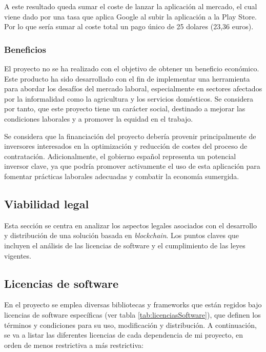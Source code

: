 A este resultado queda sumar el coste de lanzar la aplicación al mercado, el cual viene dado por una tasa que aplica Google al subir la aplicación a la Play Store. Por lo que sería sumar al coste total un pago único de 25 dolares (23,36 euros).

\subsubsection{Beneficios}

El proyecto no se ha realizado con el objetivo de obtener un beneficio económico. Este producto ha sido desarrollado con el fin de implementar una herramienta para abordar los desafíos del mercado laboral, especialmente en sectores afectados por la informalidad como la agricultura y los servicios domésticos.
Se considera por tanto, que este proyecto tiene un carácter social, destinado a mejorar las condiciones laborales y a promover la equidad en el trabajo. 

Se considera que la financiación del proyecto debería provenir principalmente de inversores interesados en la optimización y reducción de costes del proceso de contratación.
Adicionalmente, el gobierno español representa un potencial inversor clave, ya que podría promover activamente el uso de esta aplicación para fomentar prácticas laborales adecuadas y combatir la economía sumergida. 


\subsection{Viabilidad legal}

Esta sección se centra en analizar los aspectos legales asociados con el desarrollo y distribución de una solución basada en \textit{blockchain}.
Los puntos claves que incluyen el análisis de las licencias de software y el cumplimiento de las leyes vigentes.

\subsection{Licencias de software}

En el proyecto se emplea diversas bibliotecas y frameworks que están regidos bajo licencias de software específicas (ver tabla \ref{tab:licenciasSoftware}), que definen los términos y condiciones para su uso, modificación y distribución.
A continuación, se va a listar las diferentes licencias de cada dependencia de mi proyecto, en orden de menos restrictiva a más restrictiva:


